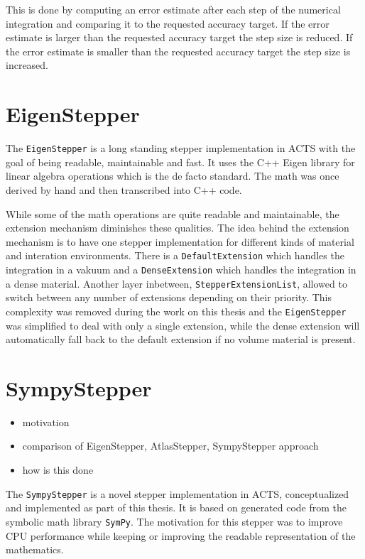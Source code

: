 This is done by computing an error estimate after each step of the numerical integration and comparing it to the requested accuracy target. If the error estimate is larger than the requested accuracy target the step size is reduced. If the error estimate is smaller than the requested accuracy target the step size is increased.

\section{EigenStepper}
\label{sec:eigenstepper}

The \texttt{EigenStepper} is a long standing stepper implementation in ACTS with the goal of being readable, maintainable and fast. It uses the C++ Eigen library for linear algebra operations which is the de facto standard. The math was once derived by hand and then transcribed into C++ code.

While some of the math operations are quite readable and maintainable, the extension mechanism diminishes these qualities. The idea behind the extension mechanism is to have one stepper implementation for different kinds of material and interation environments. There is a \texttt{DefaultExtension} which handles the integration in a vakuum and a \texttt{DenseExtension} which handles the integration in a dense material. Another layer inbetween, \texttt{StepperExtensionList}, allowed to switch between any number of extensions depending on their priority. This complexity was removed during the work on this thesis and the \texttt{EigenStepper} was simplified to deal with only a single extension, while the dense extension will automatically fall back to the default extension if no volume material is present.

\section{SympyStepper}

\begin{itemize}
    \color{red}
    \item motivation
    \item comparison of EigenStepper, AtlasStepper, SympyStepper approach
    \item how is this done
\end{itemize}

The \texttt{SympyStepper} is a novel stepper implementation in ACTS, conceptualized and implemented as part of this thesis. It is based on generated code from the symbolic math library \texttt{SymPy}. The motivation for this stepper was to improve CPU performance while keeping or improving the readable representation of the mathematics.

